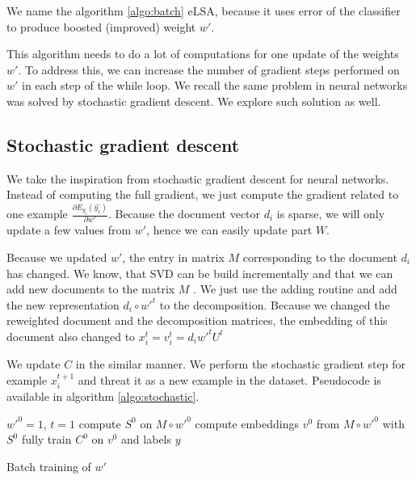     We name the algorithm \ref{algo:batch} eLSA, because it uses error of the classifier to produce boosted (improved) weight $w'$.
    
    This algorithm needs to do a lot of computations for one update of the weights $w'$.
    To address this, we can increase the number of gradient steps performed on $w'$ in each step of the while loop.
    We recall the same problem in neural networks was solved by stochastic gradient descent.
    We explore such solution as well.
    
    \subsection{Stochastic gradient descent}
    
    We take the inspiration from stochastic gradient descent for neural networks.
    Instead of computing the full gradient, we just compute the gradient related to one example $\frac{\partial E_{y_i}(\hat{y_i})}{\partial w'}$.
    Because the document vector $d_i$ is sparse, we will only update a few values from $w'$, hence we can easily update part $W$.
    
    Because we updated $w'$, the entry in matrix $M$ corresponding to the document $d_i$ has changed.
    We know, that SVD can be build incrementally and that we can add new documents to the matrix $M$ \cite{brand2006fast}.
    We just use the adding routine and add the new representation $d_i \circ w'^{t}$ to the decomposition.
    Because we changed the reweighted document and the decomposition matrices,
    the embedding of this document also changed to 
    $x_i^{t} = v_i^{t} = d_i w'^{t} U^{t}$
    
    We update $C$ in the similar manner.
    We perform the stochastic gradient step for example $x_i^{t+1}$ and threat it as a new example in the dataset.
    Pseudocode is available in algorithm \ref{algo:stochastic}.
    
    \begin{algorithm}[H]
        $w'^0 = 1$, $t=1$\;
        compute $S^0$ on $M \circ w'^{0}$\;
        compute embeddings $v^0$ from $M \circ w'^{0}$ with $S^0$\;
        fully train $C^0$ on $v^0$ and labels $y$\;
        
        \caption{Batch training of $w'$} \label{algo:stochastic}
    \end{algorithm}
    

